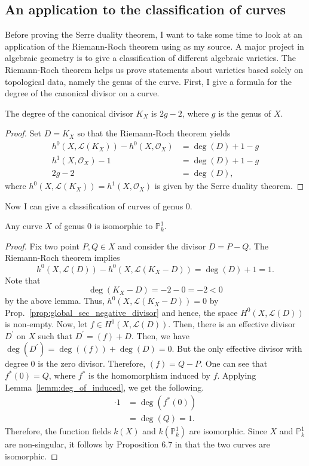 \subsection{An application to the classification of curves}
Before proving the Serre duality theorem, I want to take some time to
look at an application of the Riemann-Roch theorem using \cite{hartshorne}
as my source. A major project in algebraic geometry is to give a
classification of different algebraic varieties. The Riemann-Roch theorem
helps us prove statements about varieties based solely on topological data,
namely the genus of the curve. First, I give a formula for the degree
of the canonical divisor on a curve.
\begin{lemm}
  The degree of the canonical divisor $K_{X}$ is $2g-2$, where $g$ is the
  genus of $X$.
\end{lemm}
\begin{proof}
  Set $D=K_{X}$ so that the Riemann-Roch theorem yields
  \begin{align*}
    h^{0}(X,\mathcal{L}(K_{X}))-h^{0}(X,\mathscr{O}_{X})&=\deg(D)+1-g \\
    h^{1}(X,\mathscr{O}_{X})-1&=\deg(D)+1-g \\
    2g-2&=\deg(D),
  \end{align*}
  where $h^{0}(X,\mathcal{L}(K_{X}))=h^{1}(X,\mathscr{O}_{X})$ is given
  by the Serre duality theorem.
\end{proof}
Now I can give a classification of curves of genus 0.
\begin{thm}
  Any curve $X$ of genus 0 is isomorphic to $\mathbb{P}^{1}_{k}$.
\end{thm}
\begin{proof}
  Fix two point $P,Q\in X$ and consider the divisor $D=P-Q$. The Riemann-Roch
  theorem implies
  \[
    h^{0}(X,\mathcal{L}(D))-h^{0}(X,\mathcal{L}(K_{X}-D))
    =\deg(D)+1=1.
  \]
  Note that
  \[\deg(K_{X}-D)=-2-0=-2<0\]
  by the above lemma. Thus, $h^{0}(X,\mathcal{L}(K_{X}-D))=0$
  by Prop.~\ref{prop:global_sec_negative_divisor} and hence, the space
  $H^{0}(X,\mathcal{L}(D))$ is non-empty. Now, let
  $f\in H^{0}(X,\mathcal{L}(D))$. Then, there is an effective divisor
  $D^{\prime}$ on $X$ such that $D^{\prime}=(f)+D$. Then, we have
  $\deg\left(D^{\prime}\right)=\deg\left((f)\right)+\deg\left(D\right)=0$.
  But the only effective divisor with degree 0 is the zero divisor.
  Therefore, $(f)=Q-P$. One can see that $f^{\ast}(0)=Q$, where
  $f^{\ast}$ is the homomorphism induced by $f$. Applying
  Lemma~\ref{lemm:deg_of_induced}, we get the following.
  \begin{align*}
    [k(X):k(\mathbb{P}^{1})]\cdot 1
    &=\deg\left(f^{\ast}(0)\right) \\
    &=\deg(Q) = 1.
  \end{align*}
  Therefore, the function fields $k(X)$ and $k\left(\mathbb{P}^{1}_{k}\right)$
  are isomorphic. Since $X$ and $\mathbb{P}^{1}_{k}$ are non-singular,
  it follows by Proposition 6.7 in \cite{hartshorne} that the two curves
  are isomorphic.
\end{proof}
